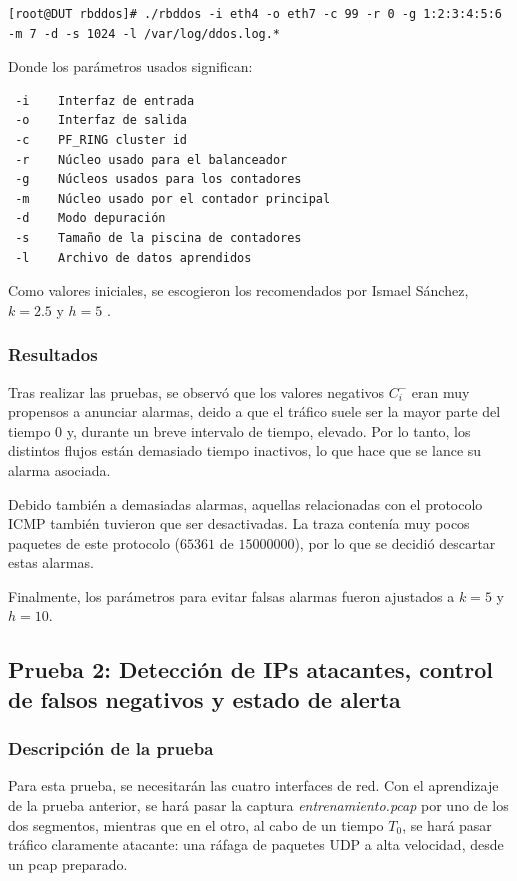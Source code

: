 \begin{verbatim}
[root@DUT rbddos]# ./rbddos -i eth4 -o eth7 -c 99 -r 0 -g 1:2:3:4:5:6  -m 7 -d -s 1024 -l /var/log/ddos.log.*
\end{verbatim}

Donde los parámetros usados significan:

\begin{verbatim}
 -i    Interfaz de entrada
 -o    Interfaz de salida
 -c    PF_RING cluster id
 -r    Núcleo usado para el balanceador
 -g    Núcleos usados para los contadores
 -m    Núcleo usado por el contador principal
 -d    Modo depuración
 -s    Tamaño de la piscina de contadores
 -l    Archivo de datos aprendidos
\end{verbatim}

Como valores iniciales, se escogieron los recomendados por Ismael Sánchez, $k=2.5$ y $h=5$ \cite{CUSUM_Carlos_III}.

\subsubsection{Resultados}
Tras realizar las pruebas, se observó que los valores negativos $C_i^-$ eran muy propensos a anunciar alarmas, deido 
a que el tráfico suele ser la mayor parte del tiempo $0$ y, durante un breve intervalo de tiempo, elevado. Por lo 
tanto, los distintos flujos están demasiado tiempo inactivos, lo que hace que se lance su alarma asociada.


Debido también a demasiadas alarmas, aquellas relacionadas con el protocolo \gls{ICMP} también tuvieron que ser 
desactivadas. La traza contenía muy pocos paquetes de este protocolo ($65361$ de $15000000$), por lo que se decidió 
descartar estas alarmas.

Finalmente, los parámetros para evitar falsas alarmas fueron ajustados a $k=5$ y $h=10$.

\subsection{Prueba 2: Detección de IPs atacantes, control de falsos negativos y estado de 
alerta}
\subsubsection{Descripción de la prueba}
Para esta prueba, se necesitarán las cuatro interfaces de red. Con el aprendizaje de la prueba anterior, se hará pasar 
la captura \emph{entrenamiento.pcap} por uno de los dos segmentos, mientras que en el otro, al cabo de un tiempo $T_0$, 
se hará pasar tráfico claramente atacante: una ráfaga de paquetes UDP a alta velocidad, desde un pcap preparado.

